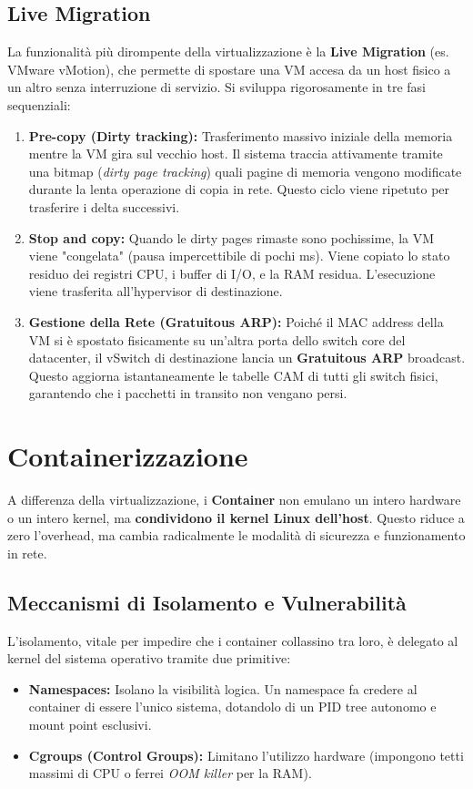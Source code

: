 \subsection{Live Migration}
La funzionalità più dirompente della virtualizzazione è la \textbf{Live Migration} (es. VMware vMotion), che permette di spostare una VM accesa da un host fisico a un altro senza interruzione di servizio.
Si sviluppa rigorosamente in tre fasi sequenziali:
\begin{enumerate}
    \item \textbf{Pre-copy (Dirty tracking):} Trasferimento massivo iniziale della memoria mentre la VM gira sul vecchio host. Il sistema traccia attivamente tramite una bitmap (\textit{dirty page tracking}) quali pagine di memoria vengono modificate durante la lenta operazione di copia in rete. Questo ciclo viene ripetuto per trasferire i delta successivi.
    \item \textbf{Stop and copy:} Quando le dirty pages rimaste sono pochissime, la VM viene "congelata" (pausa impercettibile di pochi ms). Viene copiato lo stato residuo dei registri CPU, i buffer di I/O, e la RAM residua. L'esecuzione viene trasferita all'hypervisor di destinazione.
    \item \textbf{Gestione della Rete (Gratuitous ARP):} Poiché il MAC address della VM si è spostato fisicamente su un'altra porta dello switch core del datacenter, il vSwitch di destinazione lancia un \textbf{Gratuitous ARP} broadcast. Questo aggiorna istantaneamente le tabelle CAM di tutti gli switch fisici, garantendo che i pacchetti in transito non vengano persi.
\end{enumerate}

\section{Containerizzazione}
A differenza della virtualizzazione, i \textbf{Container} non emulano un intero hardware o un intero kernel, ma \textbf{condividono il kernel Linux dell'host}. Questo riduce a zero l'overhead, ma cambia radicalmente le modalità di sicurezza e funzionamento in rete.

\subsection{Meccanismi di Isolamento e Vulnerabilità}
L'isolamento, vitale per impedire che i container collassino tra loro, è delegato al kernel del sistema operativo tramite due primitive:
\begin{itemize}
    \item \textbf{Namespaces:} Isolano la visibilità logica. Un namespace fa credere al container di essere l'unico sistema, dotandolo di un PID tree autonomo e mount point esclusivi.
    \item \textbf{Cgroups (Control Groups):} Limitano l'utilizzo hardware (impongono tetti massimi di CPU o ferrei \textit{OOM killer} per la RAM).
\end{itemize}

